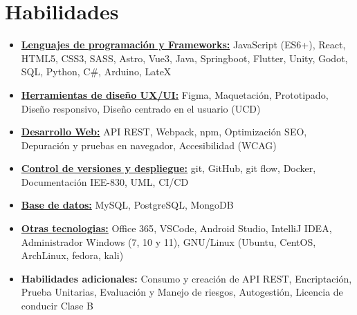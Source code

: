 \documentclass[11pt,a4paper,sans]{moderncv}
\newcommand{\sectionMargin}{-3mm}
\begin{document}
\section{Habilidades}{
    \begin{itemize}[label=\textbullet, noitemsep]
        \item {\underline{\textbf{Lenguajes de programación y Frameworks:}}
            {JavaScript (ES6+)},
            {React},
            {HTML5},
            {CSS3},
            {SASS},
            {Astro},
            {Vue3},
            {Java},
            {Springboot},
            {Flutter},
            {Unity},
            {Godot},
            {SQL},
            {Python},
            {C\#},
            {Arduino},
            {LateX}
        }
        \item {\underline{\textbf{Herramientas de diseño UX/UI:}}
            {Figma},
            {Maquetación},
            {Prototipado},
            {Diseño responsivo},
            {Diseño centrado en el usuario (UCD)}
        }
        \item {\underline{\textbf{Desarrollo Web:}}
            {API REST},
            {Webpack},
            {npm},
            {Optimización SEO},
            {Depuración y pruebas en navegador},
            {Accesibilidad (WCAG)}
        }
        \item {\underline{\textbf{Control de versiones y despliegue:}}
            {git},
            {GitHub},
            {git flow},
            {Docker},
            {Documentación IEE-830},
            {UML},
            {CI/CD}
        }
        \item {\underline{\textbf{Base de datos:}}
            {MySQL},
            {PostgreSQL},
            {MongoDB}
        }
        \item {\underline{\textbf{Otras tecnologias:}}
            {Office 365},
            {VSCode},
            {Android Studio},
            {IntelliJ IDEA},
            {Administrador Windows} (7, 10 y 11),
            {GNU/Linux} (Ubuntu, CentOS, ArchLinux, fedora, kali)
        }
        \item {\textbf{Habilidades adicionales:} 
            Consumo y creación de {API REST},
            {Encriptación},
            {Prueba Unitarias},
            Evaluación y {Manejo de riesgos},  
            {Autogestión},
            Licencia de conducir {Clase B}
        }
    \end{itemize}
}

\vspace*{\sectionMargin}
\end{document}
